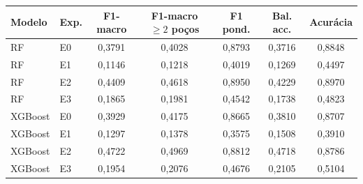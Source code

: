 \begin{tabular}{llccccc}
\toprule
Modelo & Exp. & F1-macro & F1-macro $\geq2$ poços & F1 pond. & Bal. acc. & Acurácia \\
\midrule
RF & E0 & 0,3791 & 0,4028 & 0,8793 & 0,3716 & 0,8848 \\
RF & E1 & 0,1146 & 0,1218 & 0,4019 & 0,1269 & 0,4497 \\
RF & E2 & 0,4409 & 0,4618 & 0,8950 & 0,4229 & 0,8970 \\
RF & E3 & 0,1865 & 0,1981 & 0,4542 & 0,1738 & 0,4823 \\
\midrule
XGBoost & E0 & 0,3929 & 0,4175 & 0,8665 & 0,3810 & 0,8707 \\
XGBoost & E1 & 0,1297 & 0,1378 & 0,3575 & 0,1508 & 0,3910 \\
XGBoost & E2 & 0,4722 & 0,4969 & 0,8812 & 0,4718 & 0,8786 \\
XGBoost & E3 & 0,1954 & 0,2076 & 0,4676 & 0,2105 & 0,5104 \\
\bottomrule
\end{tabular}
